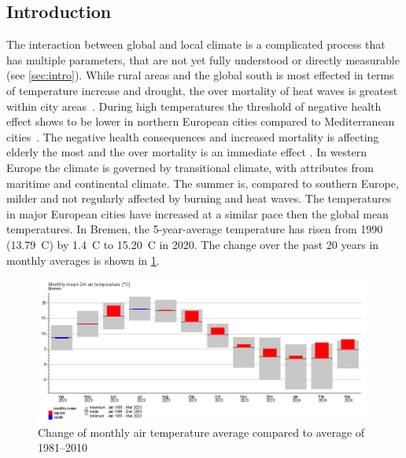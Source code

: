 \documentclass[12pt,a4paper, english,twoside]{article}
\begin{document}
    \subsection{Introduction}
      The interaction between global and local climate is a complicated process that has multiple parameters, that are not yet fully understood or directly measurable (see \cref{sec:intro}).  
      While rural areas and the global south is most effected in terms of temperature increase and drought, the over mortality of heat waves is greatest within city areas~\autocite{Gabriel2011}. During high temperatures the threshold of negative health effect shows to be lower in northern European cities compared to Mediterranean cities~\autocite{Baccini2008}. 
      The negative health consequences and increased mortality is affecting elderly the most and the over mortality is an immediate effect \autocite{Baccini2008}. 
      In western Europe the climate is governed by transitional climate, with attributes from maritime and continental climate.
      The summer is, compared to southern Europe, milder and not regularly affected by burning and heat waves. 
      The temperatures in major European cities have increased at a similar pace then the global mean temperatures. 
      In Bremen, the 5-year-average temperature has risen from 1990 (13.79\textdegree\ C)  by 1.4\textdegree\ C to 15.20\textdegree\ C in 2020.
      The change over the past 20 years in monthly averages is shown in \cref{fig:monthAvg}.
      \begin{figure}[!htbp]
          \centering
          \includegraphics[width=\textwidth]{img/BremenClimateAvgDiff2023.png}
          \caption{Change of monthly air temperature average compared to average of 1981--2010~\autocite{DWD2024a}\label{fig:monthAvg}}
      \end{figure}
\end{document}
